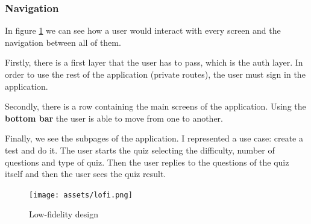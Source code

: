 \subsubsection{Navigation}
In figure \ref{fig:design_lofi} we can see how a user would interact with every screen and the navigation between all of them.

Firstly, there is a first layer that the user has to pass, which is the auth layer. In order to use the rest of the application (private routes), the user
must sign in the application.

Secondly, there is a row containing the main screens of the application. Using the \textbf{bottom bar} the user is able to move from one to another.

Finally, we see the subpages of the application.
I represented a use case: create a test and do it. The user starts the quiz selecting the difficulty, number of questions and type of quiz. Then the user replies to the questions of the quiz itself and then the user sees the quiz result.

\begin{figure}[H]
    \centering
        \texttt{[image: assets/lofi.png]}
    \caption{Low-fidelity design}
    \label{fig:design_lofi}
\end{figure}

